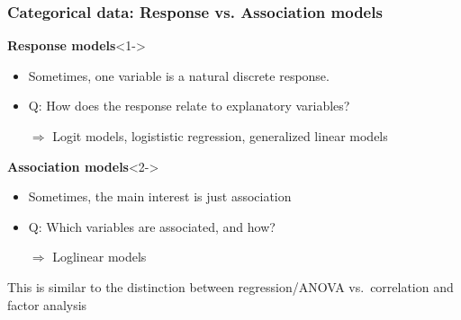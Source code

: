 \begin{frame}[label=resp-assoc]
 \frametitle{Categorical data: Response vs. Association models}
  \begin{block}{\large\bfseries Response models}<1->
   \begin{itemize}
    \item Sometimes, one variable is a  natural discrete response.
    \item Q: How does the response relate to explanatory variables?
    \item[$\Rightarrow$] Logit models, logististic regression, generalized linear models
   \end{itemize}
  \end{block}

  \begin{block}{\large\bfseries Association models}<2->
   \begin{itemize}
    \item Sometimes, the main interest is just \alert{association}
    \item Q: Which variables are associated, and \alert{how}?
    \item[$\Rightarrow$] Loglinear models
   \end{itemize}
  \end{block}

   This is similar to the distinction between regression/ANOVA vs.\
   correlation and factor analysis
\end{frame}

